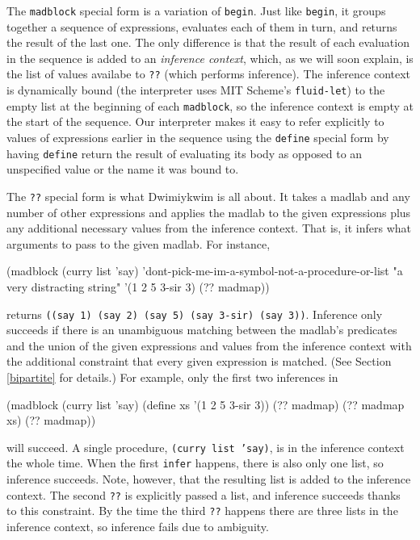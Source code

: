 \documentclass[11pt]{article}
\begin{document}
The \texttt{madblock} special form is a variation of \texttt{begin}.
Just like \texttt{begin},
it groups together a sequence of expressions,
evaluates each of them in turn,
and returns the result of the last one.
The only difference is that the result of each evaluation in the sequence
is added to an \emph{inference context},
which, as we will soon explain,
is the list of values availabe to \texttt{??} 
(which performs inference).
The inference context is dynamically bound
(the interpreter uses MIT Scheme's \texttt{fluid-let})
to the empty list at the beginning of each \texttt{madblock},
so the inference context is empty at the start of the sequence.
Our interpreter makes it easy to refer explicitly
to values of expressions earlier in the sequence
using the \texttt{define} special form
by having \texttt{define} return the result of evaluating its body
as opposed to an unspecified value or the name it was bound to.

The \texttt{??} special form is what Dwimiykwim is all about.
It takes a madlab and any number of other expressions
and applies the madlab to the given expressions
plus any additional necessary values from the inference context.
That is, it infers what arguments to pass to the given madlab.
For instance,
\begin{verbbox}
(madblock
 (curry list 'say)
 'dont-pick-me-im-a-symbol-not-a-procedure-or-list
 "a very distracting string"
 '(1 2 5 3-sir 3)
 (?? madmap))
\end{verbbox}
\begin{center}\theverbbox\end{center}
returns \texttt{((say 1) (say 2) (say 5) (say 3-sir) (say 3))}.
Inference only succeeds if there is an unambiguous matching
between the madlab's predicates and the union of the given expressions
and values from the inference context
with the additional constraint that every given expression is matched.
(See Section \ref{bipartite} for details.)
For example, only the first two inferences in
\begin{verbbox}
(madblock
 (curry list 'say)
 (define xs '(1 2 5 3-sir 3))
 (?? madmap)
 (?? madmap xs)
 (?? madmap))
\end{verbbox}
\begin{center}\theverbbox\end{center}
will succeed.
A single procedure, \texttt{(curry list 'say)},
is in the inference context the whole time.
When the first \texttt{infer} happens,
there is also only one list, so inference succeeds.
Note, however, that the resulting list is added to the inference context.
The second \texttt{??} is explicitly passed a list,
and inference succeeds thanks to this constraint.
By the time the third \texttt{??} happens
there are three lists in the inference context,
so inference fails due to ambiguity.
\end{document}

